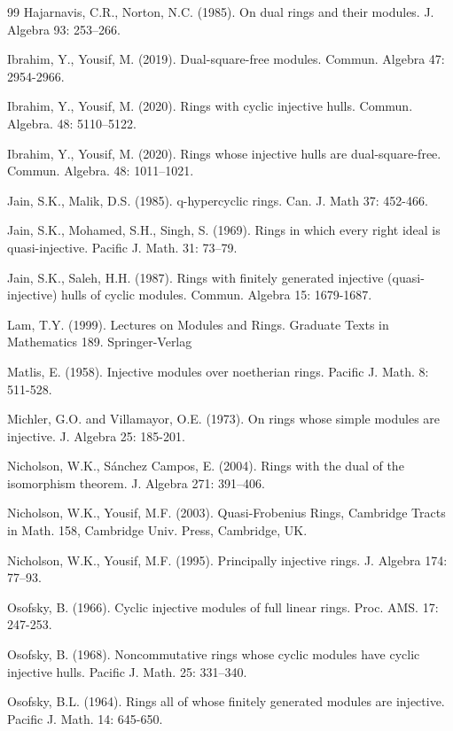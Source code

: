 \documentclass{amsart}
\theoremstyle{plain}
\numberwithin{equation}{section}
\begin{document}
\begin{thebibliography}{99}
Hajarnavis, C.R., Norton, N.C. (1985). On dual rings and their modules. J. Algebra 93: 253--266. 

Ibrahim, Y., Yousif, M. (2019). Dual-square-free modules. Commun. Algebra 47: 2954-2966. 

Ibrahim, Y., Yousif, M. (2020). Rings with cyclic injective hulls. Commun. Algebra. 48: 5110--5122. 

Ibrahim, Y., Yousif, M. (2020). Rings whose injective hulls are dual-square-free. Commun. Algebra. 48: 1011--1021. 

Jain, S.K., Malik, D.S. (1985). q-hypercyclic rings. Can. J. Math 37: 452-466. 

Jain, S.K., Mohamed, S.H., Singh, S. (1969). Rings in which every right ideal is quasi-injective. Pacific J. Math. 31: 73--79. 

Jain, S.K., Saleh, H.H. (1987). Rings with finitely generated injective (quasi-injective) hulls of cyclic modules. Commun. Algebra 15: 1679-1687. 

Lam, T.Y. (1999). Lectures on Modules and Rings. Graduate Texts in Mathematics 189. Springer-Verlag 

Matlis, E. (1958). Injective modules over noetherian rings. Pacific J. Math. 8: 511-528. 

Michler, G.O. and Villamayor, O.E. (1973). On rings whose simple modules are injective. J. Algebra 25: 185-201. 

Nicholson, W.K., S{\'a}nchez Campos, E. (2004). Rings with the dual of the isomorphism theorem. J. Algebra 271: 391--406. 

Nicholson, W.K., Yousif, M.F. (2003). Quasi-Frobenius Rings, Cambridge Tracts in Math. 158, Cambridge Univ. Press, Cambridge, UK. 

Nicholson, W.K., Yousif, M.F. (1995). Principally injective rings. J. Algebra 174: 77--93. 

Osofsky, B. (1966). Cyclic injective modules of full linear rings. Proc. AMS. 17: 247-253. 

Osofsky, B. (1968). Noncommutative rings whose cyclic modules have cyclic injective hulls. Pacific J. Math. 25: 331--340. 

Osofsky, B.L. (1964). Rings all of whose finitely generated modules are injective. Pacific J. Math. 14: 645-650. 


\end{thebibliography}
\end{document}
